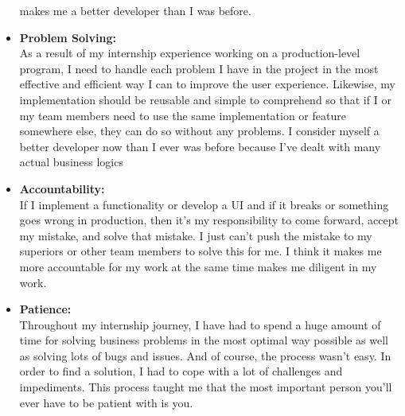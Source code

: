 \begin{flushleft}
\begin{itemize}
makes me a better developer than I was before.
\item \textbf{Problem Solving:}\\
\vspace{6pt}
As a result of my internship experience working on a production-level program, I
need to handle each problem I have in the project in the most effective and
efficient way I can to improve the user experience. Likewise, my implementation
should be reusable and simple to comprehend so that if I or my team members
need to use the same implementation or feature somewhere else, they can do so
without any problems. I consider myself a better developer now than I ever was
before because I've dealt with many actual business logics
\item \textbf{ Accountability:}\\
\vspace{6pt}
If I implement a functionality or develop a UI and if it breaks or something goes wrong in
production, then it’s my responsibility to come forward, accept my mistake, and solve
that mistake. I just can’t push the mistake to my superiors or other team members to
solve this for me. I think it makes me more accountable for my work at the same time
makes me diligent in my work.
\item \textbf{ Patience:}\\
\vspace{6pt}
Throughout my internship journey, I have had to spend a huge amount of time for solving
business problems in the most optimal way possible as well as solving lots of bugs and
issues. And of course, the process wasn’t easy. In order to find a solution, I had to cope
with a lot of challenges and impediments. This process taught me that the most
important person you’ll ever have to be patient with is you.  
\end{itemize}
  
\end{flushleft}

